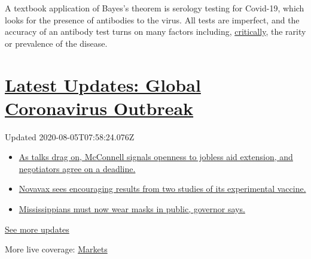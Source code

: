 A textbook application of Bayes's theorem is serology testing for
Covid-19, which looks for the presence of antibodies to the virus. All
tests are imperfect, and the accuracy of an antibody test turns on many
factors including,
\href{https://www.scientificamerican.com/article/coronavirus-antibody-tests-have-a-mathematical-pitfall/}{critically},
the rarity or prevalence of the disease.

\hypertarget{latest-updates-global-coronavirus-outbreak}{%
\section{\texorpdfstring{\href{https://www.nytimes3xbfgragh.onion/2020/08/04/world/coronavirus-cases.html?action=click\&pgtype=Article\&state=default\&region=MAIN_CONTENT_1\&context=storylines_live_updates}{Latest
Updates: Global Coronavirus
Outbreak}}{Latest Updates: Global Coronavirus Outbreak}}\label{latest-updates-global-coronavirus-outbreak}}

Updated 2020-08-05T07:58:24.076Z

\begin{itemize}
\tightlist
\item
  \href{https://www.nytimes3xbfgragh.onion/2020/08/04/world/coronavirus-cases.html?action=click\&pgtype=Article\&state=default\&region=MAIN_CONTENT_1\&context=storylines_live_updates\#link-762df92}{As
  talks drag on, McConnell signals openness to jobless aid extension,
  and negotiators agree on a deadline.}
\item
  \href{https://www.nytimes3xbfgragh.onion/2020/08/04/world/coronavirus-cases.html?action=click\&pgtype=Article\&state=default\&region=MAIN_CONTENT_1\&context=storylines_live_updates\#link-1228a480}{Novavax
  sees encouraging results from two studies of its experimental
  vaccine.}
\item
  \href{https://www.nytimes3xbfgragh.onion/2020/08/04/world/coronavirus-cases.html?action=click\&pgtype=Article\&state=default\&region=MAIN_CONTENT_1\&context=storylines_live_updates\#link-794484ed}{Mississippians
  must now wear masks in public, governor says.}
\end{itemize}

\href{https://www.nytimes3xbfgragh.onion/2020/08/04/world/coronavirus-cases.html?action=click\&pgtype=Article\&state=default\&region=MAIN_CONTENT_1\&context=storylines_live_updates}{See
more updates}

More live coverage:
\href{https://www.nytimes3xbfgragh.onion/live/2020/08/04/business/stock-market-today-coronavirus?action=click\&pgtype=Article\&state=default\&region=MAIN_CONTENT_1\&context=storylines_live_updates}{Markets}

